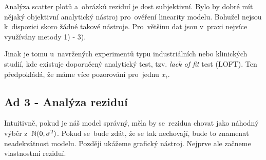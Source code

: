 \begin{example}
	Analýza scatter plotů a~obrázků reziduí je dost subjektivní. Bylo by dobré mít nějaký objektivní analytický nástroj pro~ověření linearity modelu. Bohužel nejsou k~dispozici skoro žádné takové nástroje. Pro~většinu dat jsou v~praxi nejvíce využívány metody 1) - 3).
	
	Jinak je tomu u~navržených experimentů typu industriálních nebo klinických studií, kde existuje doporučený analytický test, tzv. \textit{lack of fit} test (LOFT). Ten předpokládá, že máme více pozorování pro~jednu $x_i$.
\end{example}

\subsection{Ad 3 - Analýza reziduí}
Intuitivně, pokud je náš model správný, měla by se~rezidua chovat jako náhodný výběr z~$\mathbb{N}(0,\sigma^2)$. Pokud se~bude zdát, že se tak nechovají, bude to znamenat neadekvátnost modelu. Později ukážeme grafický nástroj. Nejprve ale začneme vlastnostmi reziduí.